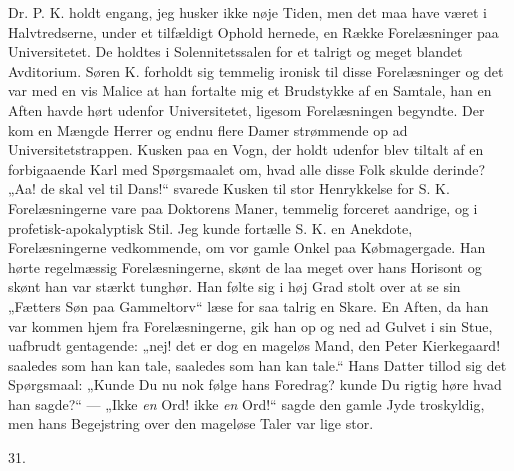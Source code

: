 \documentclass[12pt,a4paper,openany]{book}
\newcommand{\secnum}[1]{\par\begin{center}#1\end{center}\par\nobreak}
\newcommand{\opage}[1]{\marginnote{\footnotesize\textit{[#1]}}}
\begin{document}
Dr. P. K. holdt engang, jeg husker ikke nøje Tiden,
men det maa have været i Halvtredserne, under et tilfældigt
Ophold hernede, en Række Forelæsninger paa
Universitetet. De holdtes i Solennitetssalen for et talrigt
og meget blandet Avditorium. Søren K. forholdt sig
temmelig ironisk til disse Forelæsninger og det var med
en vis Malice at han fortalte mig et Brudstykke af en
Samtale, han en Aften havde hørt udenfor Universitetet,
ligesom Forelæsningen begyndte. Der kom en Mængde
Herrer og endnu flere Damer strømmende op ad Universitetstrappen.
Kusken paa en Vogn, der holdt udenfor blev
tiltalt af en forbigaaende Karl med Spørgsmaalet om,
hvad alle disse Folk skulde derinde? „Aa! de skal vel
til Dans!“ svarede Kusken til stor Henrykkelse for S. K.
Forelæsningerne vare paa Doktorens Maner, temmelig
forceret aandrige, og i profetisk-apokalyptisk Stil. Jeg
kunde fortælle S. K. en Anekdote, Forelæsningerne vedkommende,
om vor gamle Onkel paa Købmagergade.
Han hørte regelmæssig Forelæsningerne, skønt de laa
meget over hans Horisont og skønt han var stærkt
tunghør. Han følte sig i høj Grad stolt over at se sin
„Fætters Søn paa Gammeltorv“ læse for saa talrig en
\opage{359}Skare. En Aften, da han var kommen hjem fra Forelæsningerne,
gik han op og ned ad Gulvet i sin Stue,
uafbrudt gentagende: „nej! det er dog en mageløs Mand,
den Peter Kierkegaard! saaledes som han kan tale, saaledes
som han kan tale.“ Hans Datter tillod sig det
Spørgsmaal: „Kunde Du nu nok følge hans Foredrag?
kunde Du rigtig høre hvad han sagde?“ — „Ikke \emph{en}
Ord! ikke \emph{en} Ord!“ sagde den gamle Jyde troskyldig,
men hans Begejstring over den mageløse Taler var lige stor.

\secnum{31.}
\end{document}
